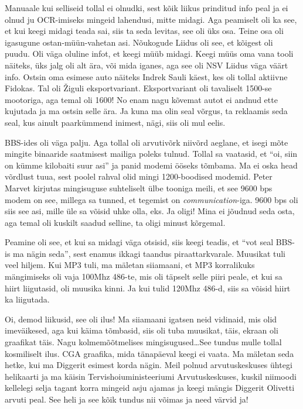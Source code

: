 Manuaale kui selliseid tollal ei olnudki, sest kõik liikus prinditud info peal ja ei olnud ju OCR-imiseks mingeid lahendusi, mitte midagi. Aga peamiselt oli ka see, et kui keegi midagi teada sai, siis ta seda levitas, see oli üks osa. Teine osa oli igasugune ostan-müün-vahetan asi. Nõukogude Liidus oli see, et kõigest oli puudu. Oli väga oluline infot, et keegi müüb midagi. Keegi müüs oma vana tooli näiteks, üks jalg oli alt ära, või mida iganes, aga see oli NSV Liidus väga väärt info. Ostsin oma esimese auto näiteks Indrek Sauli käest, kes oli tollal aktiivne Fidokas. Tal oli  Žiguli eksportvariant. Eksportvariant oli tavaliselt 1500-se mootoriga, aga temal oli 1600! No enam nagu kõvemat autot ei andnud ette kujutada ja ma ostsin selle ära. Ja kuna ma olin seal võrgus, ta reklaamis seda seal, kus ainult paarkümmend inimest, nägi, siis oli mul eelis.


BBS-ides oli väga palju. Aga tollal oli arvutivõrk niivõrd aeglane, et isegi mõte mingite binaaride saatmisest mailiga poleks tulnud. Tollal  sa vaatasid, et \enquote{oi, siin on kümme kilobaiti suur asi} ja  panid modemi ööseks tõmbama. Ma ei oska head võrdlust tuua, sest poolel rahval olid mingi 1200-boodised modemid. Peter Marvet kirjutas  mingisuguse suhteliselt ülbe tooniga meili, et see 9600 bps modem on see, millega sa tunned, et tegemist on \emph{communication}-iga. 9600 bps oli siis see asi, mille üle sa võisid uhke olla, eks.  Ja oligi! Mina ei jõudnud seda osta, aga temal oli kuskilt saadud selline, ta oligi minust kõrgemal. 

Peamine oli see, et  kui sa midagi väga otsisid, siis keegi teadis, et \enquote{vot seal BBS-is ma nägin seda}, sest enamus ikkagi taandus piraattarkvarale. Muusikat tuli veel hiljem. Kui MP3 tuli, ma mäletan siiamaani, et MP3 korralikuks mängimiseks oli vaja 100Mhz 486-te, mis oli täpselt selle piiri peale, et kui sa hiirt liigutasid,  oli muusika kinni. Ja kui tulid 120Mhz 486-d, siis sa võisid hiirt ka liigutada.


Oi, demod liikusid, see oli ilus! Ma siiamaani igatsen neid vidinaid, mis olid imeväikesed, aga kui käima tõmbasid, siis oli tuba muusikat, täis, ekraan oli  graafikat täis. Nagu kolmemõõtmelises mingisugused\ldots See tundus mulle tollal kosmiliselt ilus. CGA graafika, mida tänapäeval keegi ei vaata. Ma mäletan seda hetke, kui ma Diggerit esimest korda nägin. Meil polnud arvutuskeskuses ühtegi helikaarti ja ma käisin Tervishoiuministeeriumi Arvutuskeskuses, kuskil niimoodi kellelegi selja tagant korra mingeid asju ajamas ja keegi mängis Diggerit Olivetti arvuti peal. See heli ja see kõik tundus nii võimas ja need värvid ja! 

